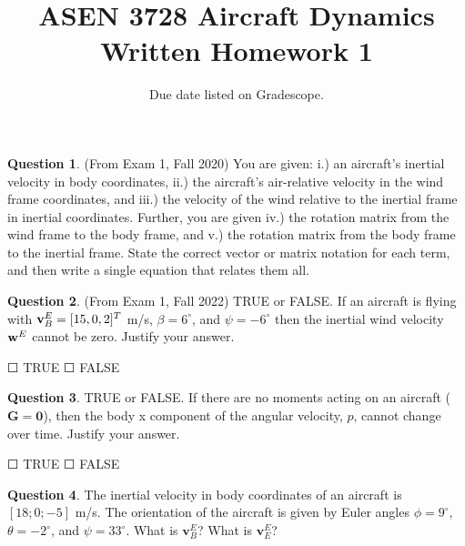 \documentclass{article}
\title{ASEN 3728 Aircraft Dynamics\\Written Homework 1}
\date{Due date listed on Gradescope.}
\theoremstyle{definition}
\newtheorem{question}{Question}
\newcommand{\option}{{\Large$\Square$ }}
\begin{document}
\maketitle

\begin{question}(From Exam 1, Fall 2020)
    You are given: i.) an aircraft’s inertial velocity in body coordinates, ii.) the aircraft’s air-relative velocity in the wind frame coordinates, and iii.) the velocity of the wind relative to the inertial frame in inertial coordinates. Further, you are given iv.) the rotation matrix from the wind frame to the body frame, and v.) the rotation matrix from the body frame to the inertial frame. State the correct vector or matrix notation for each term, and then write a single equation that relates them all.
\end{question}

\vspace{6cm}

\begin{question}(From Exam 1, Fall 2022)
    TRUE or FALSE. If an aircraft is flying with ${\bf v}^E_B = [15, 0, 2]^T$ m/s, $\beta = 6^{\circ}$, and $\psi = -6^{\circ}$ then the inertial wind velocity ${\bf w}^E$ cannot be zero.  Justify your answer.
\end{question}
\vspace{1ex}
\option TRUE \hspace{1cm} \option FALSE

\clearpage

\begin{question}
TRUE or FALSE. If there are no moments acting on an aircraft ($\mathbf{G} = \mathbf{0}$), then the body x component of the angular velocity, $p$, cannot change over time. Justify your answer.

\vspace{1ex}
\option TRUE \hspace{1cm} \option FALSE
\end{question}

\vspace{8cm}

\begin{question}
    The inertial velocity in body coordinates of an aircraft is $[18; 0; -5]$ m/s. The orientation of the aircraft is given by Euler angles $\phi = 9^{\circ}$, $\theta = -2^{\circ}$, and $\psi = 33^{\circ}$. What is $\mathbf{v}_B^E$? What is $\mathbf{v}_E^E$?
\end{question}
\end{document}
